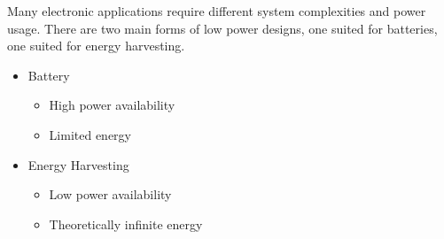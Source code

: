 Many electronic applications require different system complexities and power usage.
There are two main forms of low power designs, one suited for batteries, one suited for energy harvesting.
\begin{itemize}
	\item Battery
	\begin{itemize}
		\item High power availability
		\item Limited energy
	\end{itemize}
	\item Energy Harvesting
	\begin{itemize}
		\item Low power availability
		\item Theoretically infinite energy
	\end{itemize}
\end{itemize}
